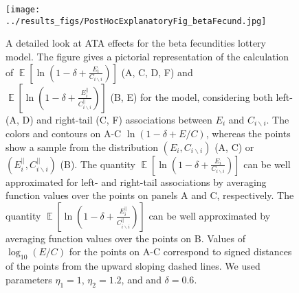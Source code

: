 \documentclass[letterpaper,11pt]{article}
\DeclareMathOperator{\E}{\mathbb{E}}%
\newcommand{\bs}{\backslash}
\begin{document}
\begin{figure}
\texttt{[image: ../results\_figs/PostHocExplanatoryFig\_betaFecund.jpg]}
\caption{A detailed look at ATA effects for the beta fecundities lottery model.
The figure gives a pictorial representation of the calculation of  
$\E \left[ \ln \left( 1-\delta+\frac{E_i}{C_{i \bs i}} \right) \right]$ (A, C, D, F) and 
$\E \left[ \ln \left( 1-\delta+\frac{E_i^{||}}{C_{i \bs i}^{||}} \right) \right]$ (B, E)
for the model, considering both left- (A, D) and right-tail (C, F) associations
between $E_i$ and $C_{i \bs i}$.
The colors and contours on A-C $\ln(1-\delta+E/C)$, whereas the points show a sample
from the distribution $(E_i,C_{i \bs i})$ (A, C) or $(E_i^{||},C_{i \bs i}^{||})$ (B).
The quantity $\E \left[ \ln \left( 1-\delta+\frac{E_i}{C_{i \bs i}} \right) \right]$ can be
well approximated for left- and right-tail associations by averaging function 
values over the points on panels A and C, respectively. The quantity
$\E \left[ \ln \left( 1-\delta+\frac{E_i^{||}}{C_{i \bs i}^{||}} \right) \right]$
can be well approximated by averaging function 
values over the points on B. Values of $\log_{10}(E/C)$ for the points on A-C correspond 
to signed distances of the points from the upward sloping dashed lines. 
We used parameters $\eta_1 = 1$, $\eta_2 = 1.2$, and and $\delta=0.6$. }\label{fig:beta_fecundidities_explanatory}
\end{figure}




\end{document}

